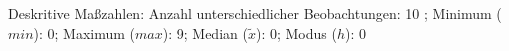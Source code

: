 				\label{tableValues:astu06a}
				\vspace*{-\baselineskip}
                    \begin{noten}
                	    \note{} Deskritive Maßzahlen:
                	    Anzahl unterschiedlicher Beobachtungen: 10%
                	    ; 
                	      Minimum ($min$): 0; 
                	      Maximum ($max$): 9; 
                	      Median ($\tilde{x}$): 0; 
                	      Modus ($h$): 0
                     \end{noten}


